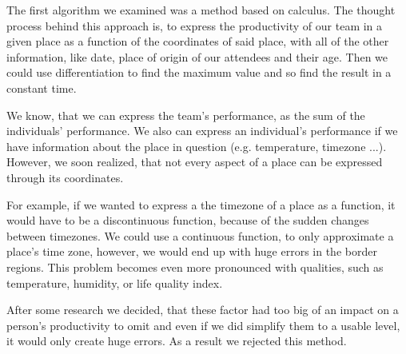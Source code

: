 
The first algorithm we examined was a method based on calculus. The thought process behind this approach is, to express the productivity of our team in a given place as a function of the coordinates of said place, with all of the other information, like date, place of origin of our attendees and their age. Then we could use differentiation to find the maximum value and so find the result in a constant time. 

We know, that we can express the team's performance, as the sum of the individuals' performance. We also can express an  individual's performance if we have information about the place in question (e.g. temperature, timezone ...). However, we soon realized, that not every aspect  of a place can be expressed through its coordinates. 

For example, if we wanted to express a the timezone of a place as a function, it would have to be a discontinuous function, because of the sudden changes between timezones. We could use a continuous function, to only approximate a place's time zone, however, we would end up with huge errors in the border regions. This problem becomes even more pronounced with qualities, such as temperature, humidity, or life quality index. 

After some research we decided, that these factor had too big of an impact on a person's productivity to omit and even if we did simplify them to a usable level, it would only create huge errors. As a result we rejected this method.